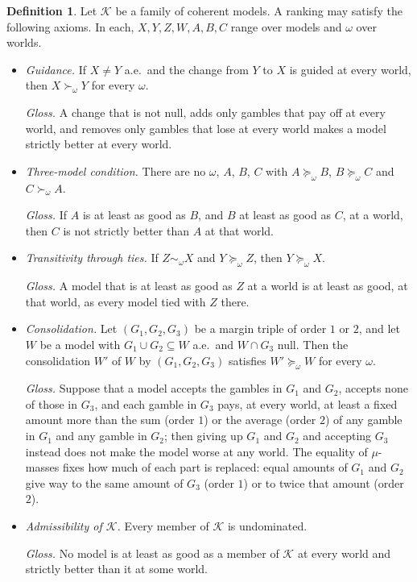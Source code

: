 \documentclass[11pt]{article}
\theoremstyle{plain}
\theoremstyle{definition}
\newtheorem{definition}[theorem]{Definition}
\theoremstyle{remark}
\begin{document}
\begin{definition}\label{def:axioms}
Let $\mathcal K$ be a family of coherent models. A ranking may satisfy the following axioms.
In each, $X,Y,Z,W,A,B,C$ range over models and $\omega$ over worlds.
\begin{itemize}[leftmargin=3.2em]
  \item[(A1)] \emph{Guidance.} If $X\ne Y$ a.e.\ and the change from $Y$ to $X$ is guided at
  every world, then $X\succ_\omega Y$ for every $\omega$.

  \emph{Gloss.} A change that is not null, adds only gambles that pay off at every world, and
  removes only gambles that lose at every world makes a model strictly better at every world.

  \item[(A2)] \emph{Three-model condition.} There are no $\omega$, $A$, $B$, $C$ with
  $A\succeq_\omega B$, $B\succeq_\omega C$ and $C\succ_\omega A$.

  \emph{Gloss.} If $A$ is at least as good as $B$, and $B$ at least as good as $C$, at a
  world, then $C$ is not strictly better than $A$ at that world.

  \item[(A3)] \emph{Transitivity through ties.} If $Z\sim_\omega X$ and $Y\succeq_\omega Z$,
  then $Y\succeq_\omega X$.

  \emph{Gloss.} A model that is at least as good as $Z$ at a world is at least as good, at
  that world, as every model tied with $Z$ there.

  \item[(A4)] \emph{Consolidation.} Let $(G_1,G_2,G_3)$ be a margin triple of order $1$ or
  $2$, and let $W$ be a model with $G_1\cup G_2\subseteq W$ a.e.\ and $W\cap G_3$ null. Then
  the consolidation $W'$ of $W$ by $(G_1,G_2,G_3)$ satisfies $W'\succeq_\omega W$ for every
  $\omega$.

  \emph{Gloss.} Suppose that a model accepts the gambles in $G_1$ and $G_2$, accepts none of those in
  $G_3$, and each gamble in $G_3$ pays, at every world, at least a fixed amount more than the
  sum (order $1$) or the average (order $2$) of any gamble in $G_1$ and any gamble in $G_2$;
  then giving up $G_1$ and $G_2$ and accepting $G_3$ instead does not make the model worse at
  any world. The equality of $\mu$-masses fixes how much of each part is replaced: equal amounts
  of $G_1$ and $G_2$ give way to the same amount of $G_3$ (order $1$) or to twice that amount
  (order $2$).

  \item[(A5)] \emph{Admissibility of $\mathcal K$.} Every member of $\mathcal K$ is
  undominated.

  \emph{Gloss.} No model is at least as good as a member of $\mathcal K$ at every world and
  strictly better than it at some world.
\end{itemize}
\end{definition}
\end{document}
